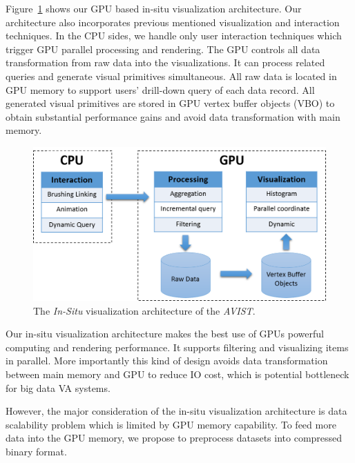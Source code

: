 \documentclass[journal]{vgtc}                %
\begin{document}
{Figure~\ref{fig:architecture} shows our GPU based in-situ visualization architecture. Our architecture also incorporates previous mentioned visualization and interaction techniques. In the CPU sides, we handle only user interaction techniques which trigger GPU parallel processing and rendering. The GPU controls all data transformation from  raw data into the visualizations. It can process related queries and generate visual primitives simultaneous. All raw data is located in GPU memory to support users' drill-down query of each data record. All generated visual primitives are stored in GPU vertex buffer objects (VBO) to obtain substantial performance gains and avoid data transformation with main memory.
 

\begin{figure}[htb]
	\centering
	\includegraphics[width=1.0\linewidth]{pic/in-situ.png}
	\parbox[t]{1.0\columnwidth}{\relax
	}
	\caption{\label{fig:architecture} The \emph{In-Situ} visualization architecture of the \emph{AVIST}.}
\end{figure}

Our in-situ visualization architecture makes the best use of GPUs powerful computing and rendering performance. It supports filtering and visualizing items in parallel. More importantly this kind of design avoids data transformation between main memory and GPU to reduce IO cost, which is potential bottleneck for big data VA systems. 


However, the major consideration of the in-situ visualization architecture is data scalability problem which is limited by GPU memory capability. To feed more data into the GPU memory, we propose to preprocess datasets into compressed binary format.


}
\end{document}
